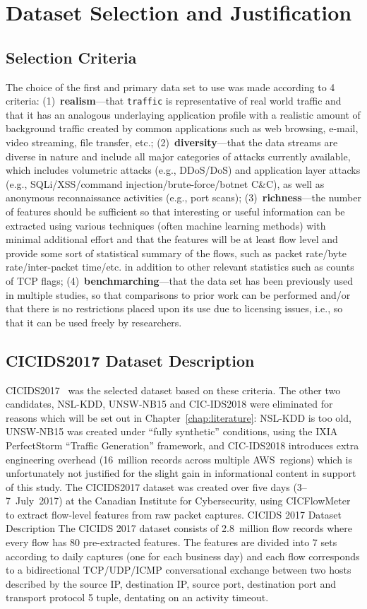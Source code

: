 \section{Dataset Selection and Justification}
\subsection{Selection Criteria}
The choice of the first and primary data set to use was made according to 4 criteria: (1)~\textbf{realism}---that \texttt{traffic} is representative of real world traffic and that it has an analogous underlaying application profile with a realistic amount of background traffic created by common applications such as web browsing, e-mail, video streaming, file transfer, etc.; (2)~\textbf{diversity}---that the data streams are diverse in nature and include all major categories of attacks currently available, which includes volumetric attacks (e.g., DDoS/DoS) and application layer attacks (e.g., SQLi/XSS/command injection/brute-force/botnet C\&C), as well as anonymous reconnaissance activities (e.g., port scans); (3)~\textbf{richness}---the number of features should be sufficient so that interesting or useful information can be extracted using various techniques (often machine learning methods) with minimal additional effort and that the features will be at least flow level and provide some sort of statistical summary of the flows, such as packet rate/byte rate/inter-packet time/etc. in addition to other relevant statistics such as counts of TCP flags; (4)~\textbf{benchmarching}---that the data set has been previously used in multiple studies, so that comparisons to prior work can be performed and/or that there is no restrictions placed upon its use due to licensing issues, i.e., so that it can be used freely by researchers.

\subsection{CICIDS2017 Dataset Description}
CICIDS2017~\cite{sharafaldin2018cicids} was the selected dataset based on these criteria. The other two candidates, NSL-KDD, UNSW-NB15 and CIC-IDS2018 were eliminated for reasons which will be set out in Chapter~\ref{chap:literature}: NSL-KDD is too old, UNSW-NB15 was created under “fully synthetic” conditions, using the IXIA PerfectStorm “Traffic Generation” framework, and CIC-IDS2018 introduces extra engineering overhead (16~million records across multiple AWS~regions) which is unfortunately not justified for the slight gain in informational content in support of this study. The CICIDS2017 dataset was created over five days (3--7~July~2017) at the Canadian Institute for Cybersecurity, using CICFlowMeter to extract flow-level features from raw packet captures. CICIDS 2017 Dataset Description
The CICIDS 2017 dataset consists of 2.8~million flow records where every flow has 80 pre-extracted features. The features are divided into 7 sets according to daily captures (one for each business day) and each flow corresponds to a bidirectional TCP/UDP/ICMP conversational exchange between two hosts described by the source IP, destination IP, source port, destination port and transport protocol 5 tuple, dentating on an activity timeout.

